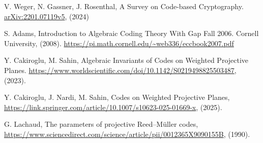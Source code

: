 \clearpage
{}
\begin{thebibliography}{20}

  V. Weger, N. Gassner, J. Rosenthal, A Survey on Code-based Cryptography. \url{arXiv:2201.07119v5}, (2024)

  S. Adams, Introduction to Algebraic Coding Theory With Gap Fall 2006. Cornell University, (2008). \url{https://pi.math.cornell.edu/~web336/eccbook2007.pdf}

  Y. Cakiroglu, M. Sahin, Algebraic Invariants of Codes on Weighted Projective Planes. \url{https://www.worldscientific.com/doi/10.1142/S0219498825503487}, (2023).

  Y. Cakiroglu, J. Nardi, M. Sahin, Codes on Weighted Projective Planes, \url{https://link.springer.com/article/10.1007/s10623-025-01669-x}, (2025).

  G. Lachaud, The parameters of projective Reed–Müller codes, \url{https://www.sciencedirect.com/science/article/pii/0012365X9090155B}, (1990).

\end{thebibliography}